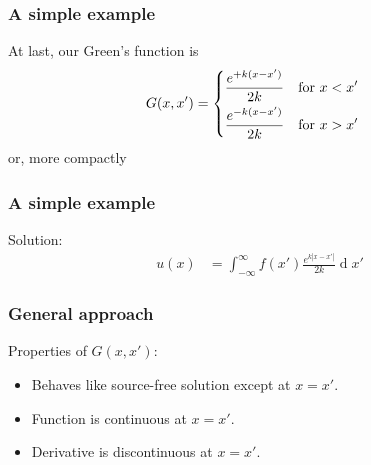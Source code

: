 \documentclass[12 pt, compress, handout, intlimits]{beamer}
\renewcommand{\d}{\operatorname{d}}
\newcommand*\widefbox[1]{\fbox{\hspace{1em}#1\hspace{1em}}}
\begin{document}

\begin{frame}[fragile]
    \frametitle{A simple example}
    At last, our Green's function is
    \begin{align*}
        G(x,x') &= 
        \begin{dcases} 
            \dfrac{e^{+k (x - x')}}{2k} & \text{for } x < x'
            \\
            \dfrac{e^{-k (x - x')}}{2k} & \text{for } x > x'
        \end{dcases}
    \end{align*}
    or, more compactly
    

\end{frame}

\note{
}

\begin{frame}[fragile]
    \frametitle{A simple example}
    Solution:
    \begin{align*}
        u(x) &= \int_{-\infty}^{\infty} f(x') \frac{e^{k|x - x'|}}{2k} \d x'
    \end{align*}
    
\end{frame}


\begin{frame}[fragile]
    \frametitle{General approach}
    Properties of $ G(x,x') $:
    \begin{itemize}
    \item
        Behaves like source-free solution except at $ x = x' $.
    \item
        Function is continuous at $ x = x' $.
    \item
        Derivative is discontinuous at $ x = x' $.
    \end{itemize}
    
\end{frame}
\end{document}
